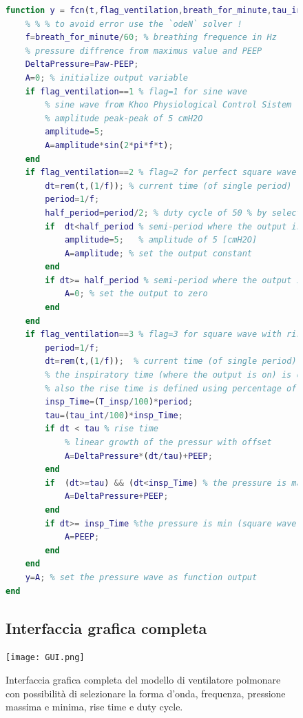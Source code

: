  \begin{figure}[h!]
\begin{lstlisting}[language=matlab,basicstyle=\tiny\ttfamily,]
function y = fcn(t,flag_ventilation,breath_for_minute,tau_int,Paw,PEEP,T_insp)
	% % % to avoid error use the `odeN` solver !
	f=breath_for_minute/60; % breathing frequence in Hz
	% pressure diffrence from maximus value and PEEP
	DeltaPressure=Paw-PEEP; 
	A=0; % initialize output variable
	if flag_ventilation==1 % flag=1 for sine wave
		% sine wave from Khoo Physiological Control Sistem
		% amplitude peak-peak of 5 cmH2O
		amplitude=5;
		A=amplitude*sin(2*pi*f*t);  
	end
	if flag_ventilation==2 % flag=2 for perfect square wave
		dt=rem(t,(1/f)); % current time (of single period)
		period=1/f; 
		half_period=period/2; % duty cycle of 50 % by selecting half period
		if  dt<half_period % semi-period where the output is on
			amplitude=5;   % amplitude of 5 [cmH2O] 
			A=amplitude; % set the output constant
		end
		if dt>= half_period % semi-period where the output is zero
			A=0; % set the output to zero 
		end 
	end
	if flag_ventilation==3 % flag=3 for square wave with rise time tau
		period=1/f; 
		dt=rem(t,(1/f));  % current time (of single period)
		% the inspiratory time (where the output is on) is defined  usign percentage of total period with T_insp from ventilator GUI
		% also the rise time is defined using percentage of inspiratory time with tau_int from ventilator GUI
		insp_Time=(T_insp/100)*period; 
		tau=(tau_int/100)*insp_Time;
		if dt < tau % rise time
			% linear growth of the pressur with offset 
			A=DeltaPressure*(dt/tau)+PEEP; 
		end
		if  (dt>=tau) && (dt<insp_Time) % the pressure is max (square wave on)
			A=DeltaPressure+PEEP;
		end
		if dt>= insp_Time %the pressure is min (square wave off)
			A=PEEP;
		end 
	end
	y=A; % set the pressure wave as function output
end
\end{lstlisting}

\subsection*{Interfaccia grafica completa}

\centering\texttt{[image: GUI.png]}
	\caption{Interfaccia grafica completa del modello di ventilatore polmonare con possibilità di selezionare la forma d'onda, frequenza, pressione massima e minima, rise time e duty cycle.}
	\label{fig:interfaccia}
\end{figure}

